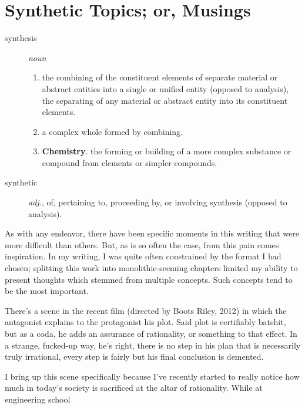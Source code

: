 \documentclass[../butidigress.tex]{subfiles}
\begin{document}
\chapter{Synthetic Topics; or, Musings}\label{chap:synthetic}
\newpage

\begin{description}
    \item [synthesis] \textit{noun}
    \begin{enumerate}
        \item the combining of the constituent elements of separate material or abstract entities into a single or unified entity (opposed to analysis), the separating of any material or abstract entity into its constituent elements.
        \item a complex whole formed by combining.
        \item \textbf{Chemistry}. the forming or building of a more complex substance or compound from elements or simpler compounds.
    \end{enumerate}
    \item [synthetic] \textit{adj.}, of, pertaining to, proceeding by, or involving synthesis (opposed to analysis).
\end{description}

As with any endeavor, there have been specific moments in this writing that were more difficult than others.
But, as is so often the case, from this pain comes inspiration.
In my writing, I was quite often constrained by the format I had chosen; splitting this work into monolithic-seeming chapters limited my ability to present thoughts which stemmed from multiple concepts.
Such concepts tend to be the most important.

There's a scene in the recent film  (directed by Boots Riley, 2012) in which the antagonist explains to the protagonist his plot.
Said plot is certifiably batshit, but as a coda, he adds an assurance of rationality,  or something to that effect.
In a strange, fucked-up way, he's right, there is no step in his plan that is necessarily truly irrational, every step is fairly  but his final conclusion is demented.

I bring up this scene specifically because I've recently started to really notice how much in today's society is sacrificed at the altar of rationality.
While at engineering school\lips
\end{document}
